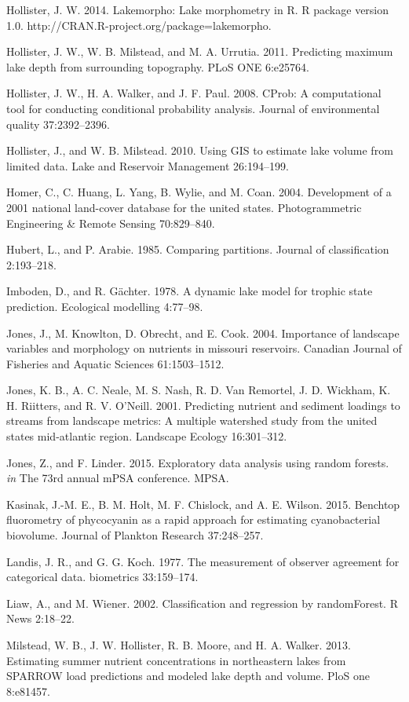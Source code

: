 \documentclass[12pt,]{article}
\begin{document}
Hollister, J. W. 2014. Lakemorpho: Lake morphometry in R. R package
version 1.0. http://CRAN.R-project.org/package=lakemorpho.

Hollister, J. W., W. B. Milstead, and M. A. Urrutia. 2011. Predicting
maximum lake depth from surrounding topography. PLoS ONE 6:e25764.

Hollister, J. W., H. A. Walker, and J. F. Paul. 2008. CProb: A
computational tool for conducting conditional probability analysis.
Journal of environmental quality 37:2392--2396.

Hollister, J., and W. B. Milstead. 2010. Using GIS to estimate lake
volume from limited data. Lake and Reservoir Management 26:194--199.

Homer, C., C. Huang, L. Yang, B. Wylie, and M. Coan. 2004. Development
of a 2001 national land-cover database for the united states.
Photogrammetric Engineering \& Remote Sensing 70:829--840.

Hubert, L., and P. Arabie. 1985. Comparing partitions. Journal of
classification 2:193--218.

Imboden, D., and R. G{ä}chter. 1978. A dynamic lake model for trophic
state prediction. Ecological modelling 4:77--98.

Jones, J., M. Knowlton, D. Obrecht, and E. Cook. 2004. Importance of
landscape variables and morphology on nutrients in missouri reservoirs.
Canadian Journal of Fisheries and Aquatic Sciences 61:1503--1512.

Jones, K. B., A. C. Neale, M. S. Nash, R. D. Van Remortel, J. D.
Wickham, K. H. Riitters, and R. V. O'Neill. 2001. Predicting nutrient
and sediment loadings to streams from landscape metrics: A multiple
watershed study from the united states mid-atlantic region. Landscape
Ecology 16:301--312.

Jones, Z., and F. Linder. 2015. Exploratory data analysis using random
forests. \emph{in} The 73rd annual mPSA conference. MPSA.

Kasinak, J.-M. E., B. M. Holt, M. F. Chislock, and A. E. Wilson. 2015.
Benchtop fluorometry of phycocyanin as a rapid approach for estimating
cyanobacterial biovolume. Journal of Plankton Research 37:248--257.

Landis, J. R., and G. G. Koch. 1977. The measurement of observer
agreement for categorical data. biometrics 33:159--174.

Liaw, A., and M. Wiener. 2002. Classification and regression by
randomForest. R News 2:18--22.

Milstead, W. B., J. W. Hollister, R. B. Moore, and H. A. Walker. 2013.
Estimating summer nutrient concentrations in northeastern lakes from
SPARROW load predictions and modeled lake depth and volume. PloS one
8:e81457.
\end{document}
